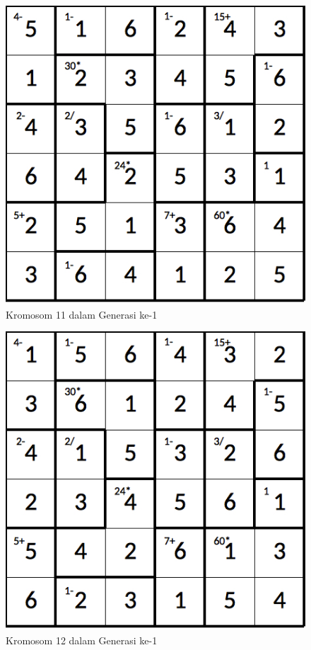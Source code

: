 \begin{figure}
\centering
\captionsetup{justification=centering}
\includegraphics[scale=0.333]{Gambar/hybridgenetic/Generation1Chromosome11}
\caption[Kromosom 11 dalam Generasi ke-1]{Kromosom 11 dalam Generasi ke-1}
\label{fig:analisisg1k11}
\end{figure}

\begin{figure}
\centering
\captionsetup{justification=centering}
\includegraphics[scale=0.333]{Gambar/hybridgenetic/Generation1Chromosome12}
\caption[Kromosom 12 dalam Generasi ke-1]{Kromosom 12 dalam Generasi ke-1}
\label{fig:analisisg1k12}
\end{figure}


